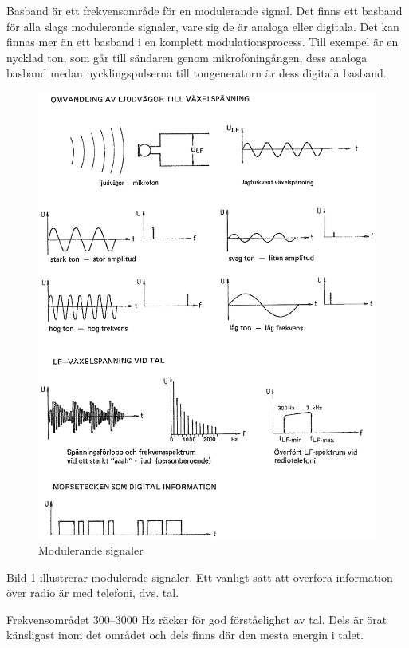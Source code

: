 Basband är ett frekvensområde för en modulerande signal.
Det finns ett basband för alla slags modulerande signaler, vare sig de är
analoga eller digitala.
Det kan finnas mer än ett basband i en komplett modulationsprocess.
Till exempel är en nycklad ton, som går till sändaren genom mikrofoningången,
dess analoga basband medan nycklingspulserna till tongeneratorn är dess
digitala basband.

\begin{figure}
\includegraphics[width=\textwidth]{images/cropped_pdfs/bild_2_1-23.pdf}
\caption{Modulerande signaler}
\label{fig:BildII1-23}
\end{figure}

Bild \ref{fig:BildII1-23} illustrerar modulerade signaler.
Ett vanligt sätt att överföra information över radio är med telefoni, dvs.
tal.

Frekvensområdet 300--3000 \unit{Hz} räcker för god förståelighet av tal.
Dels är örat känsligast inom det området och dels finns där den mesta energin
i talet.

